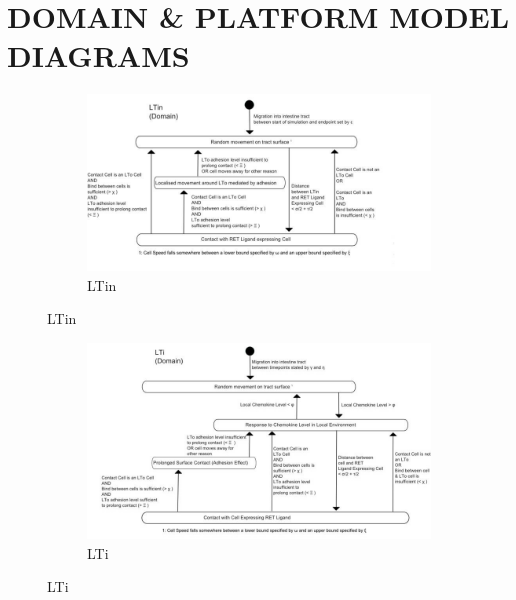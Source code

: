 \documentclass{UoYCSproject}
\begin{document}
\chapter{DOMAIN \& PLATFORM MODEL DIAGRAMS}

\begin{figure}[htp]
\centering
\begin{subfigure}{0.95\textwidth}
\centering
\includegraphics[width=\textwidth]{Appendix/Models/Domain/LTin}
\caption{LTin}
\end{subfigure}
\end{figure}

\begin{figure}[htp]\ContinuedFloat
\centering
\begin{subfigure}{0.95\textwidth}
\centering
\includegraphics[width=\textwidth]{Appendix/Models/Domain/LTi}
\caption{LTi}
\end{subfigure}
\end{figure}
\end{document}
